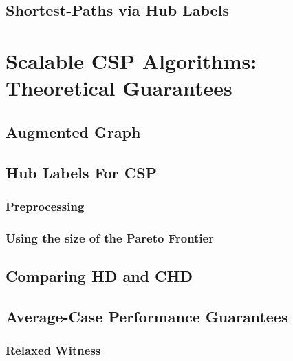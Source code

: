 \documentclass[screen,sigconf]{acmart}
\begin{document}
\subsection{Shortest-Paths via Hub Labels}
\label{ssec:hldef}


\section{Scalable CSP Algorithms:\texorpdfstring{\\}{ } Theoretical Guarantees}
\label{sec:chd}


\subsection{Augmented Graph}
\label{ssec:aug}


\subsection{Hub Labels For CSP}
\label{ssec:hlcsp}


\subsubsection{Preprocessing}
\label{sec:preproc}


\subsubsection{Using the size of the Pareto Frontier}
\label{sec:frontier}


\subsection{Comparing HD and CHD}
\label{ssec:hdvschd}


\subsection{Average-Case Performance Guarantees}
\label{sec:avg_hd}

\subsubsection{Relaxed Witness}
\label{sec:relaxed_witness}

\end{document}
